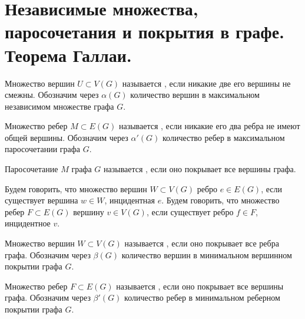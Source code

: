 \section{Независимые множества, паросочетания и покрытия в графе. Теорема Галлаи.}
\begin{definition}
	Множество вершин $U \subset V(G)$ называется , если никакие две его вершины не смежны. Обозначим через $\alpha(G)$ количество вершин в максимальном независимом множестве графа $G$.
\end{definition}

\begin{definition}
    Множество ребер $M \subset E(G)$ называется , если никакие его два ребра не имеют общей вершины. Обозначим через $\alpha'(G)$ количество ребер в максимальном паросочетании графа $G$.
\end{definition}

\begin{definition}
    Паросочетание $M$ графа $G$ называется , если оно покрывает все вершины графа.
\end{definition}

\begin{definition}
    Будем говорить, что множество вершин $W \subset V(G)$  ребро $e \in E(G)$, если существует вершина $w \in W$, инцидентная $e$. Будем говорить, что множество ребер $F \subset E(G)$  вершину $v \in V(G)$, если существует ребро $f \in F$, инцидентное $v$.
\end{definition}

\begin{definition}
    Множество вершин $W \subset V(G)$ называется , если оно покрывает все ребра графа. Обозначим через $\beta(G)$ количество вершин в минимальном вершинном покрытии графа $G$.
\end{definition}

\begin{definition}
    Множество ребер $F \subset E(G)$ называется , если оно покрывает все вершины графа. Обозначим через $\beta'(G)$ количество ребер в минимальном реберном покрытии графа $G$.
\end{definition}

